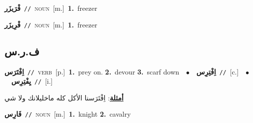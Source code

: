 \documentclass[10pt,a4paper,twoside]{article} %
\begin{document}
\begin{multicols}{2}
{\setlength\topsep{0pt}\textbf{\foreignlanguage{arabic}{فْرَيزَر}}\ {\color{gray}\texttt{//}\color{black}}\ \textsc{noun}\ [m.]\ \textbf{1.}~freezer\ } \vspace{2mm}

{\setlength\topsep{0pt}\textbf{\foreignlanguage{arabic}{فْرِيزَر}}\ {\color{gray}\texttt{//}\color{black}}\ \textsc{noun}\ [m.]\ \textbf{1.}~freezer\ } \vspace{2mm}

\vspace{-3mm}
\subsection*{\color{blue}\foreignlanguage{arabic}{ف.ر.س}\color{blue}{}} 

{\setlength\topsep{0pt}\textbf{\foreignlanguage{arabic}{اِفْتَرَس}}\ {\color{gray}\texttt{//}\color{black}}\ \textsc{verb}\ [p.]\ \textbf{1.}~prey on.  \textbf{2.}~devour  \textbf{3.}~scarf down\ \ $\bullet$\ \ \setlength\topsep{0pt}\textbf{\foreignlanguage{arabic}{اِفْتِرِس}}\ {\color{gray}\texttt{//}\color{black}}\ [c.]\ \ $\bullet$\ \ \setlength\topsep{0pt}\textbf{\foreignlanguage{arabic}{يِفْتِرِس}}\ {\color{gray}\texttt{//}\color{black}}\ [i.]\  \begin{flushright}\color{gray}\foreignlanguage{arabic}{\textbf{\underline{\foreignlanguage{arabic}{أمثلة}}}: اِفْتَرَسنا الأكل كله ماخليلانك ولا شي}\end{flushright}\color{black}} \vspace{2mm}

{\setlength\topsep{0pt}\textbf{\foreignlanguage{arabic}{فَارِس}}\ {\color{gray}\texttt{//}\color{black}}\ \textsc{noun}\ [m.]\ \textbf{1.}~knight  \textbf{2.}~cavalry\ } \vspace{2mm}


\end{multicols}
\end{document}
